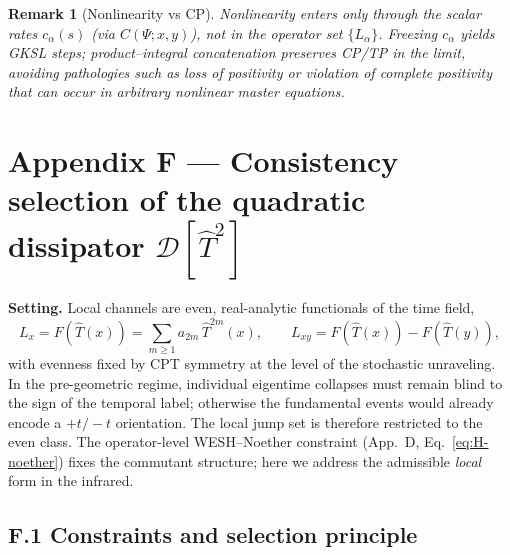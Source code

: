 \documentclass[12pt,a4paper]{article}
\newtheorem{remark}{Remark}[section]
\numberwithin{equation}{section}
\begin{document}
\begin{remark}[Nonlinearity vs CP]
Nonlinearity enters only through the \emph{scalar} rates $c_\alpha(s)$ (via $C(\Psi;x,y)$), not in the operator set $\{L_\alpha\}$. Freezing $c_\alpha$ yields GKSL steps; product–integral concatenation preserves CP/TP in the limit, avoiding pathologies such as loss of positivity or violation  of complete positivity that can occur in arbitrary nonlinear  master equations.
\end{remark}
\endgroup

\section*{Appendix F — Consistency selection of the quadratic dissipator \texorpdfstring{$\mathcal D[\hat T^2]$}{D[T\textasciicircum 2]}}
\label{app:QuadSelection}

\begingroup
\setcounter{equation}{0}
\renewcommand\theequation{F.\arabic{equation}}
\renewcommand{\theHequation}{F.\arabic{equation}}
\setcounter{theorem}{0}
\renewcommand\thetheorem{F.\arabic{theorem}}
\renewcommand{\theHtheorem}{F.\arabic{theorem}}
\setcounter{lemma}{0}
\renewcommand\thelemma{F.\arabic{lemma}}
\renewcommand{\theHlemma}{F.\arabic{lemma}}
\setcounter{remark}{0}
\renewcommand\theremark{F.\arabic{remark}}
\renewcommand{\theHremark}{F.\arabic{remark}}
\setcounter{proposition}{0}
\renewcommand\theproposition{F.\arabic{proposition}}
\renewcommand{\theHproposition}{F.\arabic{proposition}}

\vspace{0.5cm}
\noindent\textbf{Setting.}
Local channels are even, real-analytic functionals of the time field,
\[
L_x=F(\hat T(x))=\sum_{m\ge1}a_{2m}\,\hat T^{2m}(x),\qquad
L_{xy}=F(\hat T(x))-F(\hat T(y)),
\]
with evenness fixed by CPT symmetry at the level of the stochastic 
unraveling. In the pre-geometric regime, individual eigentime collapses 
must remain blind to the sign of the temporal label; otherwise the 
fundamental events would already encode a $+t/-t$ orientation. The local 
jump set is therefore restricted to the even class. The operator-level 
WESH--Noether constraint (App.~D, Eq.~\eqref{eq:H-noether}) fixes the 
commutant structure; here we address the admissible \emph{local} form in 
the infrared.

\subsection*{F.1 Constraints and selection principle}
\vspace{0.2cm}
\end{document}
